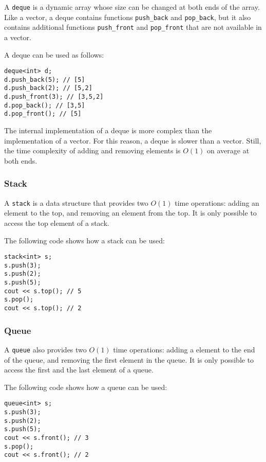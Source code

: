 
A \texttt{deque} is a dynamic array
whose size can be changed at both ends of the array.
Like a vector, a deque contains functions
\texttt{push\_back} and \texttt{pop\_back}, but
it also contains additional functions
\texttt{push\_front} and \texttt{pop\_front}
that are not available in a vector.

A deque can be used as follows:
\begin{lstlisting}
deque<int> d;
d.push_back(5); // [5]
d.push_back(2); // [5,2]
d.push_front(3); // [3,5,2]
d.pop_back(); // [3,5]
d.pop_front(); // [5]
\end{lstlisting}

The internal implementation of a deque
is more complex than the implementation of a vector.
For this reason, a deque is slower than a vector.
Still, the time complexity of adding and removing
elements is $O(1)$ on average at both ends.

\subsubsection{Stack}


A \texttt{stack}
is a data structure that provides two
$O(1)$ time operations:
adding an element to the top,
and removing an element from the top.
It is only possible to access the top
element of a stack.

The following code shows how a stack can be used:
\begin{lstlisting}
stack<int> s;
s.push(3);
s.push(2);
s.push(5);
cout << s.top(); // 5
s.pop();
cout << s.top(); // 2
\end{lstlisting}
\subsubsection{Queue}


A \texttt{queue} also
provides two $O(1)$ time operations:
adding a element to the end of the queue,
and removing the first element in the queue.
It is only possible to access the first
and the last element of a queue.

The following code shows how a queue can be used:
\begin{lstlisting}
queue<int> s;
s.push(3);
s.push(2);
s.push(5);
cout << s.front(); // 3
s.pop();
cout << s.front(); // 2
\end{lstlisting}


